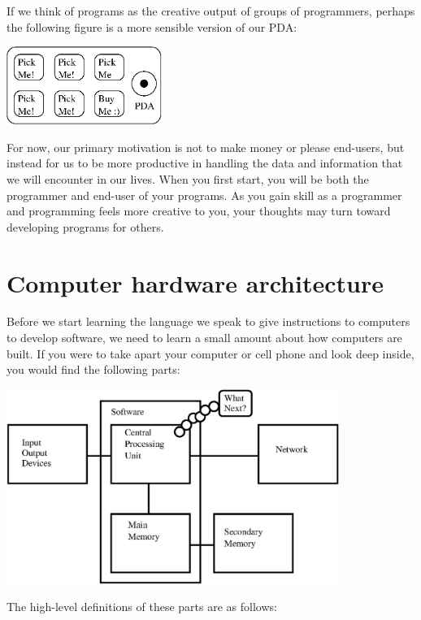 \documentclass[10pt]{book}
\begin{document}
If we think of programs as the creative output of groups of programmers,
perhaps the following figure is a more sensible version of our PDA:

\beforefig
\centerline{\includegraphics[height=1.00in]{figs2/pda2.eps}}
\afterfig

For now, our primary motivation is not to make money or please end-users, but
instead for us to be more productive in handling the data and 
information that we will encounter in our lives.
When you first start, you will be both the programmer and end-user of
your programs.  As you gain skill as a programmer and
programming feels more creative to you, your thoughts may turn
toward developing programs for others.

\section{Computer hardware architecture}

Before we start learning the language we 
speak to give instructions to computers to 
develop software, we need to learn a small amount about 
how computers are built.  If you were to take
apart your computer or cell phone and look deep
inside, you would find the following parts:

\beforefig
\centerline{\includegraphics[height=2.50in]{figs2/arch.eps}}
\afterfig

The high-level definitions of these parts are as follows:
\end{document}
